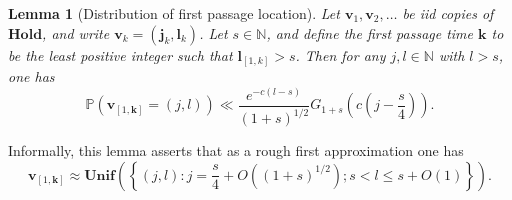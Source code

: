 \documentclass[12pt,a4paper,reqno]{amsart}
\numberwithin{equation}{section}
\theoremstyle{plain}
\newtheorem{lemma}[theorem]{Lemma}
\theoremstyle{definition}
\renewcommand\P{\mathbb{P}}
\newcommand\N{\mathbb{N}}
\renewcommand\j{\mathbf{j}}
\renewcommand\k{\mathbf{k}}
\renewcommand\v{\mathbf{v}}
\renewcommand\l{\mathbf{l}}
\newcommand\Unif{\mathbf{Unif}}
\newcommand\Hold{\mathbf{Hold}}
\begin{document}
\begin{lemma}[Distribution of first passage location]\label{stop} Let $\v_1,\v_2,\dots$ be iid copies of $\Hold$, and write $\v_k = (\j_k,\l_k)$.  Let $s \in \N$, and define the first passage time $\k$ to be the least positive integer such that $\l_{[1,k]} > s$.  Then for any $j,l \in \N$ with $l > s$, one has
$$
\P( \v_{[1,\k]} = (j,l) ) \ll \frac{e^{-c(l-s)}}{(1+s)^{1/2}} G_{1+s}\left( c(j - \frac{s}{4}) \right).$$
\end{lemma}

Informally, this lemma asserts that as a rough first approximation one has
\begin{equation}\label{rough}
 \v_{[1,\k]} \approx \Unif\left( \left\{ (j,l): j = \frac{s}{4} + O( (1+s)^{1/2}); s < l \leq s + O(1) \right\} \right).
\end{equation}
\end{document}
